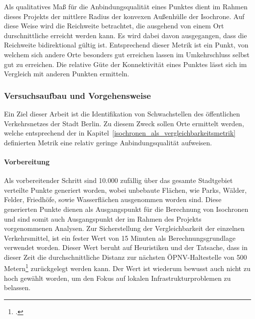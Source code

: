 
Als qualitatives Maß für die Anbindungsqualität eines Punktes dient im Rahmen dieses Projekts der mittlere Radius der konvexen Außenhülle der Isochrone. Auf diese Weise wird die Reichweite betrachtet, die ausgehend von einem Ort durschnittliche erreicht werden kann. Es wird dabei davon ausgegangen, dass die Reichweite bidirektional gültig ist. Entsprechend dieser Metrik ist ein Punkt, von welchem sich andere Orte besonders gut erreichen lassen im Umkehrschluss selbst gut zu erreichen. Die relative Güte der Konnektivität eines Punktes lässt sich im Vergleich mit anderen Punkten ermitteln.

\subsubsection{Versuchsaufbau und Vorgehensweise}
\label{versuchsaufbau_und_vorgehensweise}

Ein Ziel dieser Arbeit ist die Identifikation von Schwachstellen des öffentlichen Verkehrsnetzes der Stadt Berlin. Zu diesem Zweck sollen Orte ermittelt werden, welche entsprechend der in Kapitel~\ref{isochronen_als_vergleichbarkeitsmetrik} definierten Metrik eine relativ geringe Anbindungsqualität aufweisen.

\paragraph*{Vorbereitung}
\label{vorbereitung}

Als vorbereitender Schritt sind 10.000 zufällig über das gesamte Stadtgebiet verteilte Punkte generiert worden, wobei unbebaute Flächen, wie Parks, Wälder, Felder, Friedhöfe, sowie Wasserflächen ausgenommen worden sind. Diese generierten Punkte dienen als Ausgangspunkt für die Berechnung von Isochronen und sind somit auch Ausgangspunkt der im Rahmen des Projekts vorgenommenen Analysen. Zur Sicherstellung der Vergleichbarkeit der einzelnen Verkehrsmittel, ist ein fester Wert von 15 Minuten als Berechnungsgrundlage verwendet worden. Dieser Wert beruht auf Heuristiken und der Tatsache, dass in dieser Zeit die durchschnittliche Distanz zur nächsten ÖPNV-Haltestelle von 500 Metern\footcite{cnb} zurückgelegt werden kann. Der Wert ist wiederum bewusst auch nicht zu hoch gewählt worden, um den Fokus auf lokalen Infrastrukturproblemen zu belassen.

